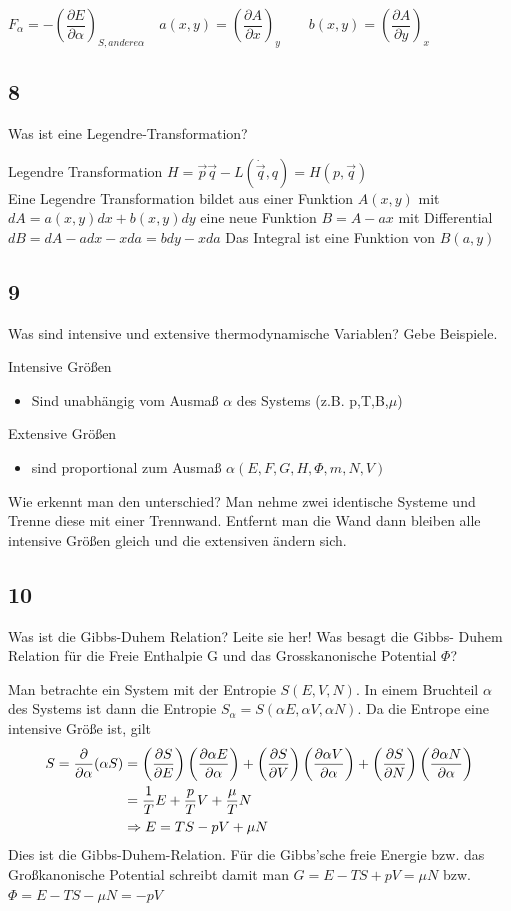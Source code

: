 \documentclass[12pt,a4paper]{report}
\newcommand{\partd}[1]{\ensuremath {\frac{\partial}{\partial #1}}}
\newcommand{\partdd}[2]{\ensuremath {\left(\frac{\partial #1}{\partial #2}}\right)}
\newenvironment{myfrag}{\begin{it}}{\end{it}\vspace{3mm}\par}
\numberwithin{equation}{section}
\begin{document}
$ F_\alpha = - \left( \dfrac{\partial E}{\partial \alpha }\right) _{S,andere \alpha} \quad a(x,y)= \left( \dfrac{\partial A}{\partial x}\right) _y \qquad b(x,y) = \left( \dfrac{\partial A}{\partial y }\right) _x$
\subsection{8}
\begin{myfrag}
Was ist eine Legendre-Transformation?
\end{myfrag}
Legendre Transformation $H= \vec{p}\vec{q}-L(\dot{\vec{q}},q)=H(p,\vec{q} )$ \\
Eine Legendre Transformation bildet aus einer Funktion $A(x,y)$ mit $ dA= a(x,y)dx +b(x,y)dy$ eine neue Funktion $B=A-ax$ mit Differential $ dB = dA - adx -xda = bdy -xda$ Das Integral ist eine Funktion von $B(a,y)$
\subsection{9}
\begin{myfrag}
Was sind intensive und extensive thermodynamische Variablen? Gebe
Beispiele.
\end{myfrag} \quad \newline
Intensive Größen 
\begin{itemize}
\item Sind unabhängig vom Ausmaß $\alpha $ des Systems (z.B. p,T,B,$\mu $)
\end{itemize}
Extensive Größen
\begin{itemize}
\item sind proportional zum Ausmaß $\alpha (E,F,G,H, \Phi , m, N, V)$
\end{itemize}
Wie erkennt man den unterschied? Man nehme zwei identische Systeme und Trenne diese mit einer Trennwand. Entfernt man die Wand dann bleiben alle intensive Größen gleich und die extensiven ändern sich.
\subsection{10}
\begin{myfrag}
Was ist die Gibbs-Duhem Relation? Leite sie her! Was besagt die Gibbs-
Duhem Relation für die Freie Enthalpie G und das Grosskanonische
Potential $\Phi$?
\end{myfrag}
Man betrachte ein System mit der Entropie $S(E,V,N)$. In einem Bruchteil $\alpha$ des Systems ist dann die Entropie $S_\alpha=S(\alpha E,\alpha V,\alpha N)$. Da die Entrope eine intensive Größe ist, gilt
\begin{align}
S=\partd{\alpha}(\alpha S)
	&=\partdd{S}{E}\partdd{\alpha E}{\alpha}+\partdd{S}{V}\partdd{\alpha V}{\alpha}+\partdd{S}{N}\partdd{\alpha N}{\alpha}\\
	&=\frac{1}{T}E+\frac{p}{T}V+\frac{\mu}{T}N\\
	&\mathrel{\Rightarrow} E=TS-pV+ \mu N
\end{align}
Dies ist die Gibbs-Duhem-Relation. Für die Gibbs'sche freie Energie bzw. das Großkanonische Potential schreibt damit man $G = E - T S + pV = \mu N$ bzw. $\Phi = E - T S - \mu N = -pV$
\end{document}
